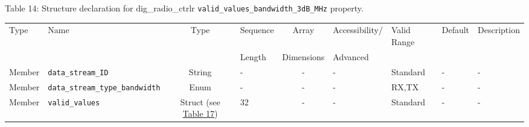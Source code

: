 \documentclass{article}
\def\comp{dig\_radio\_ctrlr}
\begin{document}
\begin{landscape}
	\noindent Table \hypertarget{tab14}{14}: Structure declaration for \comp{} \verb+valid_values_bandwidth_3dB_MHz+ property.
	\begin{scriptsize}
		\noindent\begin{longtable}{|p{1.8cm}|p{3.6cm}|c|p{2cm}|c|p{2cm}|p{1.7cm}|p{0.8cm}|p{4.97cm}|}
			\hline
			\rowcolor{blue}
			Type         & Name                                & Type & Sequence & Array      & Accessibility/ & Valid Range  & Default & Description                                                                                                                                                                                                                       \\
			\rowcolor{blue}
			             &                                     &      & Length   & Dimensions & Advanced       &              &         &                                                                                                                                                                                                                             \\
			\hline
			Member       & \verb+data_stream_ID+               & String& -       & -          & -              & Standard     & -       & - \\
			\hline
			Member       & \verb+data_stream_type_bandwidth+   & Enum  & -       & -          & -              & RX,TX        & -       & - \\
			\hline
			Member       & \verb+valid_values+                 & Struct (see \hyperlink{tab17}{Table 17}) & 32      & -          & -              & Standard & -       & - \\
			\hline
		\end{longtable}
	\end{scriptsize}


\end{landscape}
\end{document}
